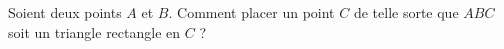 
\begin{exercice}\label{exo2smath-0258}

    Soient deux points \( A\) et \( B\). Comment placer un point \( C\) de telle sorte que \( ABC\) soit un triangle rectangle en \( C\) ?

\end{exercice}
